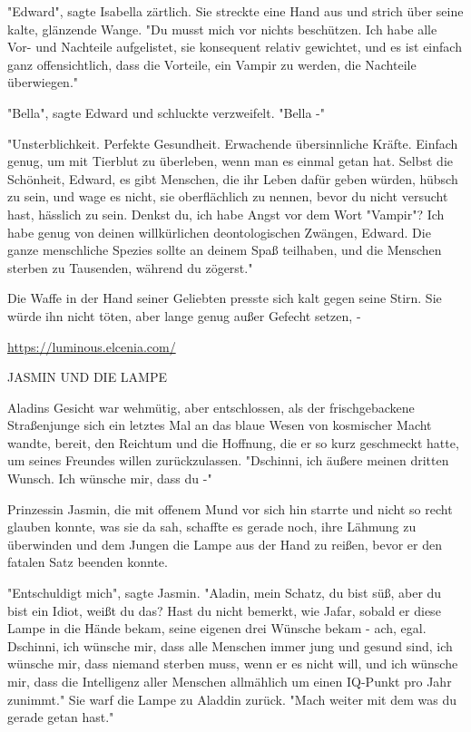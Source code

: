 {"Edward", sagte Isabella zärtlich. Sie streckte eine Hand aus und strich über seine kalte, glänzende Wange. "Du musst mich vor nichts beschützen. Ich habe alle Vor- und Nachteile aufgelistet, sie konsequent relativ gewichtet, und es ist einfach ganz offensichtlich, dass die Vorteile, ein Vampir zu werden, die Nachteile überwiegen."

"Bella", sagte Edward und schluckte verzweifelt. "Bella -"

"Unsterblichkeit. Perfekte Gesundheit. Erwachende übersinnliche Kräfte. Einfach genug, um mit Tierblut zu überleben, wenn man es einmal getan hat. Selbst die Schönheit, Edward, es gibt Menschen, die ihr Leben dafür geben würden, hübsch zu sein, und wage es nicht, sie oberflächlich zu nennen, bevor du nicht versucht hast, hässlich zu sein. Denkst du, ich habe Angst vor dem Wort "Vampir"? Ich habe genug von deinen willkürlichen deontologischen Zwängen, Edward. Die ganze menschliche Spezies sollte an deinem Spaß teilhaben, und die Menschen sterben zu Tausenden, während du zögerst."

Die Waffe in der Hand seiner Geliebten presste sich kalt gegen seine Stirn. Sie würde ihn nicht töten, aber lange genug außer Gefecht setzen, -

\url{https://luminous.elcenia.com/}

JASMIN UND DIE LAMPE

Aladins Gesicht war wehmütig, aber entschlossen, als der frischgebackene Straßenjunge sich ein letztes Mal an das blaue Wesen von kosmischer Macht wandte, bereit, den Reichtum und die Hoffnung, die er so kurz geschmeckt hatte, um seines Freundes willen zurückzulassen. "Dschinni, ich äußere meinen dritten Wunsch. Ich wünsche mir, dass du -"

Prinzessin Jasmin, die mit offenem Mund vor sich hin starrte und nicht so recht glauben konnte, was sie da sah, schaffte es gerade noch, ihre Lähmung zu überwinden und dem Jungen die Lampe aus der Hand zu reißen, bevor er den fatalen Satz beenden konnte.

"Entschuldigt mich", sagte Jasmin. "Aladin, mein Schatz, du bist süß, aber du bist ein Idiot, weißt du das? Hast du nicht bemerkt, wie Jafar, sobald er diese Lampe in die Hände bekam, seine eigenen drei Wünsche bekam - ach, egal. Dschinni, ich wünsche mir, dass alle Menschen immer jung und gesund sind, ich wünsche mir, dass niemand sterben muss, wenn er es nicht will, und ich wünsche mir, dass die Intelligenz aller Menschen allmählich um einen IQ-Punkt pro Jahr zunimmt." Sie warf die Lampe zu Aladdin zurück. "Mach weiter mit dem was du gerade getan hast."

}
